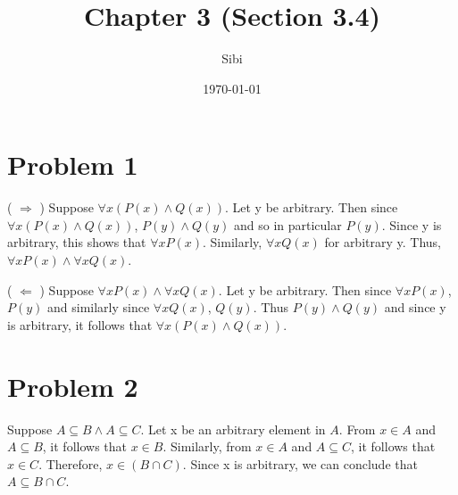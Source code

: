 \documentclass{article}
\begin{document}
\title{Chapter 3 (Section 3.4)}
\author{Sibi}
\date{\today}
\maketitle
\newpage

\section{Problem 1}

( $\Rightarrow$ ) Suppose $\forall x ( P(x) \land Q(x))$. Let y be
arbitrary. Then since $\forall x (P(x) \land Q(x))$, $P(y) \land Q(y)$
and so in particular $P(y)$. Since y is arbitrary, this shows that
$\forall x P(x)$. Similarly, $\forall x Q(x)$ for arbitrary y. Thus,
$\forall x P(x) \land \forall x Q(x)$.

( $\Leftarrow$ ) Suppose $\forall x P(x) \land \forall x Q(x)$. Let y
be arbitrary. Then since $\forall x P(x)$, $P(y)$ and similarly since
$\forall x Q(x)$, $Q(y)$. Thus $P(y) \land Q(y)$ and since y is
arbitrary, it follows that $\forall x(P(x) \land Q(x))$.

\section{Problem 2}

Suppose $A \subseteq B \land A \subseteq C$. Let x be an arbitrary
element in $A$. From $x \in A$ and $A \subseteq B$, it follows that $x
\in B$. Similarly, from $x \in A$ and $A \subseteq C$, it follows that
$x \in C$. Therefore, $x \in (B \cap C)$. Since x is arbitrary, we can
conclude that $A \subseteq B \cap C$.
\end{document}
